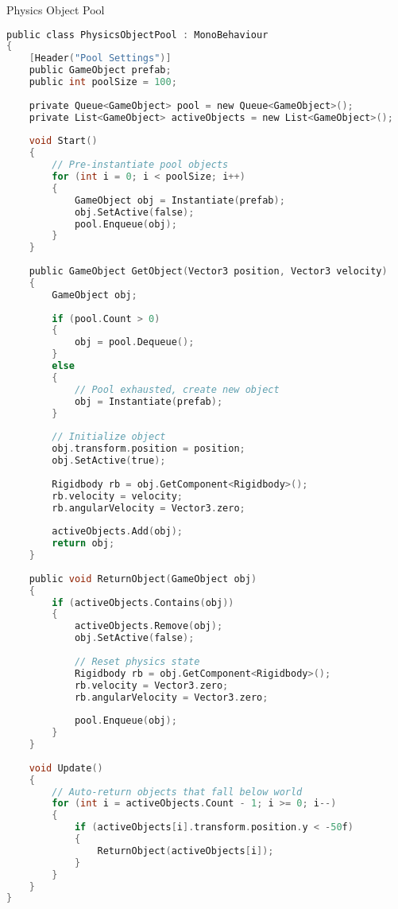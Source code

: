 \begin{code}{Physics Object Pool}\\
\begin{lstlisting}[language=C, style=basesmol]
public class PhysicsObjectPool : MonoBehaviour 
{
    [Header("Pool Settings")]
    public GameObject prefab;
    public int poolSize = 100;
    
    private Queue<GameObject> pool = new Queue<GameObject>();
    private List<GameObject> activeObjects = new List<GameObject>();
    
    void Start() 
    {
        // Pre-instantiate pool objects
        for (int i = 0; i < poolSize; i++) 
        {
            GameObject obj = Instantiate(prefab);
            obj.SetActive(false);
            pool.Enqueue(obj);
        }
    }
    
    public GameObject GetObject(Vector3 position, Vector3 velocity) 
    {
        GameObject obj;
        
        if (pool.Count > 0) 
        {
            obj = pool.Dequeue();
        } 
        else 
        {
            // Pool exhausted, create new object
            obj = Instantiate(prefab);
        }
        
        // Initialize object
        obj.transform.position = position;
        obj.SetActive(true);
        
        Rigidbody rb = obj.GetComponent<Rigidbody>();
        rb.velocity = velocity;
        rb.angularVelocity = Vector3.zero;
        
        activeObjects.Add(obj);
        return obj;
    }
    
    public void ReturnObject(GameObject obj) 
    {
        if (activeObjects.Contains(obj)) 
        {
            activeObjects.Remove(obj);
            obj.SetActive(false);
            
            // Reset physics state
            Rigidbody rb = obj.GetComponent<Rigidbody>();
            rb.velocity = Vector3.zero;
            rb.angularVelocity = Vector3.zero;
            
            pool.Enqueue(obj);
        }
    }
    
    void Update() 
    {
        // Auto-return objects that fall below world
        for (int i = activeObjects.Count - 1; i >= 0; i--) 
        {
            if (activeObjects[i].transform.position.y < -50f) 
            {
                ReturnObject(activeObjects[i]);
            }
        }
    }
}
\end{lstlisting}
\end{code}

